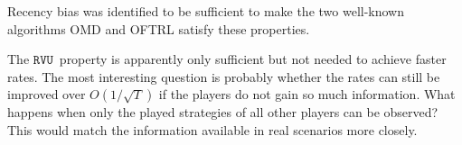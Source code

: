 \documentclass[a4paper]{article}
\theoremstyle{definition}
\newcommand{\myprop}{\ensuremath{\texttt{RVU}}}
\begin{document}
Recency bias was identified to be sufficient to make the two
well-known algorithms OMD and OFTRL satisfy these properties.

The \myprop~property is apparently only sufficient but not needed to
achieve faster rates.
The most interesting question is probably whether the rates can still
be improved over $O(1/\sqrt{T})$ if the players do not gain so much
information.
What happens when only the played strategies of all other players can
be observed? This would match the information available in real scenarios more closely.


\clearpage
{}


\printbibliography
\end{document}
